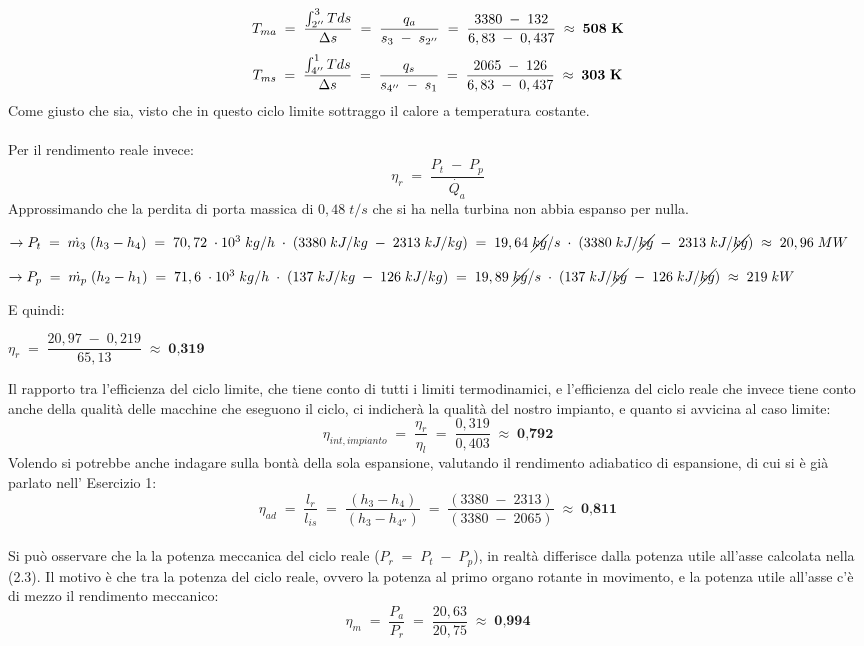 \documentclass[a4paper, twoside, 12pt]{report}
\begin{document}
\begin{equation}
	T_{ma}\;=\;\dfrac{\int_{2''}^{3}Tds}{\Delta s}\;=\;\dfrac{q_{a}}{s_{3}\;-\;s_{2''}}\;=\;\dfrac{3380\;-\;132}{6,83\;-\;0,437}\;\approx\;\textbf{508\;K}
\end{equation}
\begin{equation}
	T_{ms}\;=\;\dfrac{\int_{4''}^{1}Tds}{\Delta s}\;=\;\dfrac{q_{s}}{s_{4''}\;-\;s_{1}}\;=\;\dfrac{2065\;-\;126}{6,83\;-\;0,437}\;\approx\;\textbf{303\;K}
\end{equation}
Come giusto che sia, visto che in questo ciclo limite sottraggo il calore a temperatura costante.\\
\\Per il rendimento reale invece:
\begin{equation}
	\eta_{r}\;=\;\dfrac{P_{t}\;-\;P_{p}}{\dot{Q_{a}}}
\end{equation}
Approssimando che la perdita di porta massica di $0,48\;t/s$ che si ha nella turbina non abbia espanso per nulla.
\begin{center}
	$\to P_{t}\;=\;\dot{m_{3}}\;(h_{3}-h_{4})\;=\;70,72\;\cdot10^{3}\;kg/h\;\cdot\;(3380\;kJ/kg\;-\;2313\;kJ/kg)\;=\;19,64\;\cancel{kg}/s\;\cdot\;(3380\;kJ/\cancel{kg}\;-\;2313\;kJ/\cancel{kg})\;\approx\;20,96\;MW$
\end{center}
\begin{center}
	$\to P_{p}\;=\;\dot{m_{p}}\;(h_{2}-h_{1})\;=\;71,6\;\cdot10^{3}\;kg/h\;\cdot\;(137\;kJ/kg\;-\;126\;kJ/kg)\;=\;19,89\;\cancel{kg}/s\;\cdot\;(137\;kJ/\cancel{kg}\;-\;126\;kJ/\cancel{kg})\;\approx\;219\;kW$
\end{center}
E quindi:
\begin{center}
	$\eta_{r}\;=\;\dfrac{20,97\;-\;0,219}{65,13}\;\approx\;\textbf{0,319}$
\end{center}
Il rapporto tra l'efficienza del ciclo limite, che tiene conto di tutti i limiti termodinamici, e l'efficienza del ciclo reale che invece tiene conto anche della qualità delle macchine che eseguono il ciclo, ci indicherà la qualità del nostro impianto, e quanto si avvicina al caso limite:
\begin{equation}
	\eta_{int,impianto}\;=\;\dfrac{\eta_{r}}{\eta_{l}}\;=\;\dfrac{0,319}{0,403}\;\approx\;\textbf{0,792}
\end{equation}
Volendo si potrebbe anche indagare sulla bontà della sola espansione, valutando il rendimento adiabatico di espansione, di cui si è già parlato nell' Esercizio 1:
\begin{equation}
	\eta_{ad}\;=\;\dfrac{l_{r}}{l_{is}}\;=\;\dfrac{(h_{3}-h_{4})}{(h_{3}-h_{4''})}\;=\;\dfrac{(3380\;-\;2313)}{(3380\;-\;2065)}\;\approx\;\textbf{0,811}
\end{equation}
\\Si può osservare che la la potenza meccanica del ciclo reale ($P_{r}\;=\;P_{t}\;-\;P_{p}$), in realtà differisce dalla potenza utile all'asse calcolata nella (2.3). Il motivo è che tra la potenza del ciclo reale, ovvero la potenza al primo organo rotante in movimento, e la potenza utile all'asse c'è di mezzo il rendimento meccanico:
\begin{equation}
	\eta_{m}\;=\;\dfrac{P_{a}}{P_{r}}\;=\;\dfrac{20,63}{20,75}\;\approx\;\textbf{0,994}
\end{equation}
\newpage
\end{document}
